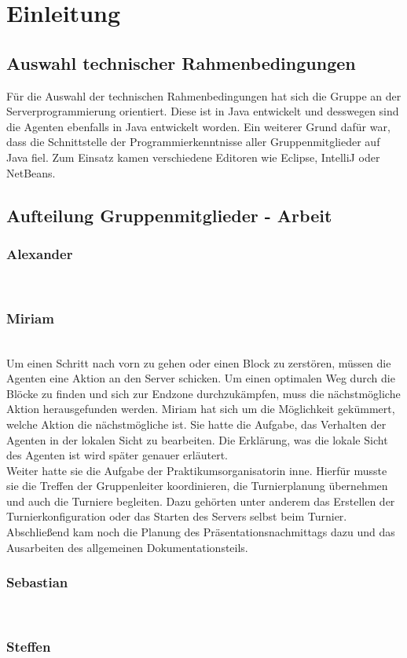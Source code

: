 \section{Einleitung}

\subsection{Auswahl technischer Rahmenbedingungen}
Für die Auswahl der technischen Rahmenbedingungen hat sich die Gruppe an der Serverprogrammierung orientiert. Diese ist in Java entwickelt und desswegen sind die Agenten ebenfalls in Java entwickelt worden. Ein weiterer Grund dafür war, dass die Schnittstelle der Programmierkenntnisse aller Gruppenmitglieder auf Java fiel. Zum Einsatz kamen verschiedene Editoren wie Eclipse\cite{eclipse}, IntelliJ\cite{intellij} oder NetBeans\cite{netbeans}.

\subsection{Aufteilung Gruppenmitglieder - Arbeit}
\subsubsection{Alexander} ~\\
\subsubsection{Miriam} ~\\
Um einen Schritt nach vorn zu gehen oder einen Block zu zerstören, müssen die Agenten eine Aktion an den Server schicken. Um einen optimalen Weg durch die Blöcke zu finden und sich zur Endzone durchzukämpfen, muss die nächstmögliche Aktion herausgefunden werden. Miriam hat sich um die Möglichkeit gekümmert, welche Aktion die nächstmögliche ist. Sie hatte die Aufgabe, das Verhalten der Agenten in der lokalen Sicht zu bearbeiten. Die Erklärung, was die lokale Sicht des Agenten ist wird später genauer erläutert. \\

Weiter hatte sie die Aufgabe der Praktikumsorganisatorin inne. Hierfür musste sie die Treffen der Gruppenleiter koordinieren, die Turnierplanung übernehmen und auch die Turniere begleiten. Dazu gehörten unter anderem das Erstellen der Turnierkonfiguration oder das Starten des Servers selbst beim Turnier. Abschließend kam noch die Planung des Präsentationsnachmittags dazu und das Ausarbeiten des allgemeinen Dokumentationsteils.

\subsubsection{Sebastian} ~\\
\subsubsection{Steffen} ~\\